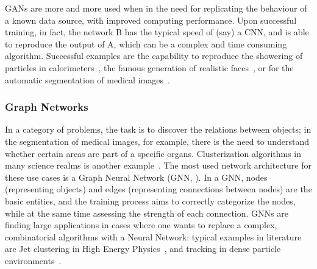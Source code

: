 GANs are more and more used when in the need for replicating the behaviour of a known data source, with improved computing performance. Upon successful training, in fact, the network B has the typical speed of (say) a CNN, and is able to reproduce the output of A, which can be a complex and time consuming algorithm. Successful examples are the capability to reproduce the showering of particles in calorimeters~\cite{atlascalogan, cmscalogan}, the famous generation of realistic faces~\cite{faces}, or for the automatic segmentation of medical images~\cite{ganmed}.


\subsubsection{Graph Networks}
In a category of problems, the task is to discover the relations between objects; in the  segmentation of medical images, for example, there is the need to understand whether certain areas are part of a specific organs. Clusterization algorithms in many science realms is another example~\cite{clusterization}.
The most used  network architecture for these use cases is a Graph Neural Network (GNN, \cite{gnn}).
In a GNN, nodes (representing objects) and edges (representing connections between nodes) are the basic entities, and the training process aims to correctly categorize the nodes, while at the same time assessing the strength of each connection.
GNNs are finding large applications in cases where one wants to replace a complex, combinatorial algorithms with a Neural Network: typical examples in literature are Jet clustering in High Energy Physics~\cite{graphclustering}, and tracking in dense particle environments~\cite{graphtracking}.


